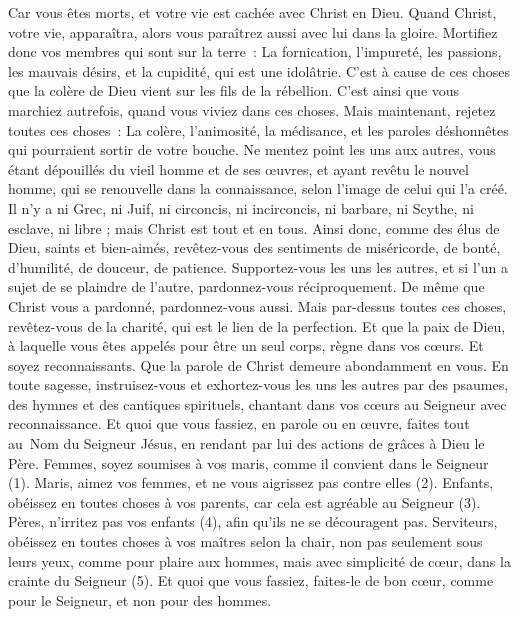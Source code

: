 \begin{multicols}{2}
Car vous êtes morts, et votre vie est cachée avec Christ en Dieu.
Quand Christ, votre vie, apparaîtra, alors vous paraîtrez aussi avec lui dans la gloire.
Mortifiez donc vos membres qui sont sur la terre : La fornication, l’impureté, les passions, les mauvais désirs, et la cupidité, qui est une idolâtrie.
C’est à cause de ces choses que la colère de Dieu vient sur les fils de la rébellion.
C’est ainsi que vous marchiez autrefois, quand vous viviez dans ces choses.
Mais maintenant, rejetez toutes ces choses : La colère, l'animosité, la médisance, et les paroles déshonnêtes qui pourraient sortir de votre bouche.
Ne mentez point les uns aux autres, vous étant dépouillés du vieil homme et de ses œuvres,
et ayant revêtu le nouvel homme, qui se renouvelle dans la connaissance, selon l'image de celui qui l'a créé.
Il n'y a ni Grec, ni Juif, ni circoncis, ni incirconcis, ni barbare, ni Scythe, ni esclave, ni libre ; mais Christ est tout et en tous.
Ainsi donc, comme des élus de Dieu, saints et bien-aimés, revêtez-vous des sentiments de miséricorde, de bonté, d'humilité, de douceur, de patience.
Supportez-vous les uns les autres, et si l’un a sujet de se plaindre de l’autre, pardonnez-vous réciproquement. De même que Christ vous a pardonné, pardonnez-vous aussi.
Mais par-dessus toutes ces choses, revêtez-vous de la charité, qui est le lien de la perfection.
Et que la paix de Dieu, à laquelle vous êtes appelés pour être un seul corps, règne dans vos cœurs. Et soyez reconnaissants.
Que la parole de Christ demeure abondamment en vous. En toute sagesse, instruisez-vous et exhortez-vous les uns les autres par des psaumes, des hymnes et des cantiques spirituels, chantant dans vos cœurs au Seigneur avec reconnaissance.
Et quoi que vous fassiez, en parole ou en œuvre, faites tout au Nom du Seigneur Jésus, en rendant par lui des actions de grâces à Dieu le Père.
Femmes, soyez soumises à vos maris, comme il convient dans le Seigneur (1).
Maris, aimez vos femmes, et ne vous aigrissez pas contre elles (2).
Enfants, obéissez en toutes choses à vos parents, car cela est agréable au Seigneur (3).
Pères, n'irritez pas vos enfants (4), afin qu'ils ne se découragent pas.
Serviteurs, obéissez en toutes choses à vos maîtres selon la chair, non pas seulement sous leurs yeux, comme pour plaire aux hommes, mais avec simplicité de cœur, dans la crainte du Seigneur (5).
Et quoi que vous fassiez, faites-le de bon cœur, comme pour le Seigneur, et non pour des hommes.

\end{multicols}
